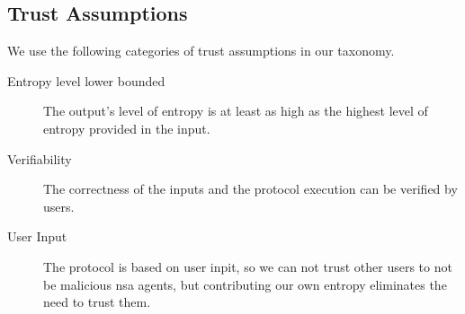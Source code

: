 \subsection{Trust Assumptions}
\label{sub:trust_assumptions}
We use the following categories of trust assumptions in our taxonomy. 
\begin{description}
    \item [Entropy level lower bounded] The output's level of entropy is at least as high as the highest level of entropy provided in the input. 
    \item [Verifiability] The correctness of the inputs and the protocol execution can be verified by users. 
    \item [User Input] The protocol is based on user inpit, so we can not trust other users to not be malicious \gls{nsa} agents, but contributing our own entropy eliminates the need to trust them. 
\end{description}

